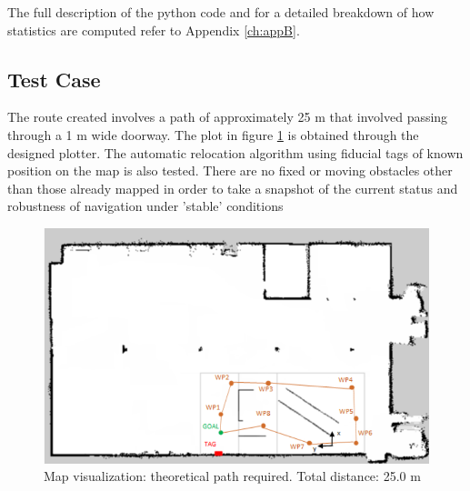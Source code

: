 The full description of the python code and for a detailed breakdown of how statistics are computed refer to Appendix \ref{ch:appB}.
    
\subsection{Test Case}

The route created involves a path of approximately 25 m that involved passing through a 1 m wide doorway. The plot in figure \ref{fig: test_map} is obtained through the designed plotter.
The automatic relocation algorithm using fiducial tags of known position on the map is also tested. 
There are no fixed or moving obstacles other than those already mapped in order to take a snapshot of the current status and robustness of navigation under 'stable' conditions 

\begin{figure}[H]
    \centering
    \includegraphics[scale=0.5]{Images/Chapter 5/testmap.png}
    \caption{Map visualization: theoretical path required. Total distance: 25.0 m}
    \label{fig: test_map}
\end{figure}

